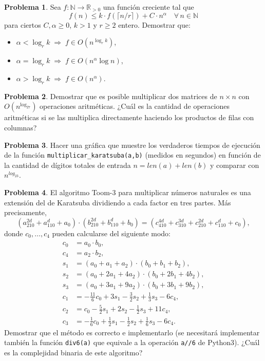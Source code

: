 \documentclass[a4paper, 11pt]{article}
\newcommand{\NN}{\mathbb{N}}
\newcommand{\RR}{\mathbb{R}}
\newcounter{numerodetema}
\theoremstyle{plain}
\theoremstyle{definition}
\newtheorem{prob}{Problema}[numerodetema]
\begin{document}
\begin{prob}\label{prob-complexity}
Sea $f:\NN\to\RR_{>0}$ una función creciente tal que
\[
  f(n)\leq k\cdot f(\lceil n/r\rceil)+C\cdot n^\alpha\quad \forall\,n\in\NN
\]
para ciertos $C,\alpha\geq 0$, $k>1$ y $r\geq 2$ entero. Demostrar que:
\begin{itemize}
\item $\alpha < \log_rk\;\Longrightarrow\; f\in O(n^{\log_rk})$,
\item $\alpha = \log_rk\;\Longrightarrow\; f\in O(n^\alpha\log n)$,
\item $\alpha > \log_rk\;\Longrightarrow\; f\in O(n^\alpha)$.
\end{itemize}
\end{prob}

\begin{prob}
Demostrar que es posible multiplicar dos matrices de $n\times n$ con
$O(n^{\log_27})$ operaciones aritméticas. ¿Cuál es la cantidad de
operaciones aritméticas si se las multiplica directamente haciendo los
productos de filas con columnas?
\end{prob}

\begin{prob}
Hacer una gráfica que muestre los verdaderos tiempos de ejecución de la
función \texttt{multiplicar\_karatsuba(a,b)} (medidos en segundos) en función
de la cantidad de dígitos totales de entrada $n=len(a)+len(b)$ y comparar con
$n^{log_23}$.
\end{prob}

\begin{prob}\label{prob-toom-3}
El algoritmo Toom-3 para multiplicar números naturales es una extensión
del de Karatsuba dividiendo a cada factor en tres partes. Más precisamente,
\[
   (a_210^{2d}+a_110^d+a_0)\cdot(b_210^{2d}+b_110^d+b_0) =
   (c_410^{4d}+c_310^{3d}+c_210^{2d}+c_110^d+c_0),
\]
donde $c_0,\ldots,c_4$ pueden calcularse del siguiente modo:
\[
\begin{aligned}
   c_0 &= a_0\cdot b_0, \\
   c_4 &= a_2\cdot b_2, \\
   s_1 &= (a_0+a_1+a_2)\cdot(b_0+b_1+b_2),     \\
   s_2 &= (a_0+2a_1+4a_2)\cdot(b_0+2b_1+4b_2), \\
   s_3 &= (a_0+3a_1+9a_2)\cdot(b_0+3b_1+9b_2), \\
   c_1 &= -\frac{11}6c_0+3s_1-\frac32s_2+\frac13s_3-6c_4, \\
   c_2 &= c_0-\frac52s_1+2s_2-\frac12s_3+11c_4, \\
   c_3 &= -\frac16c_0+\frac12s_1-\frac12s_2+\frac16s_3-6c_4.
\end{aligned}
\]
Demostrar que el método es correcto e implementarlo (se necesitará implementar
también la función \texttt{div6(a)} que equivale a la operación \texttt{a//6}
de Python3). ¿Cuál es la complejidad binaria de este algoritmo?
\end{prob}
\end{document}

